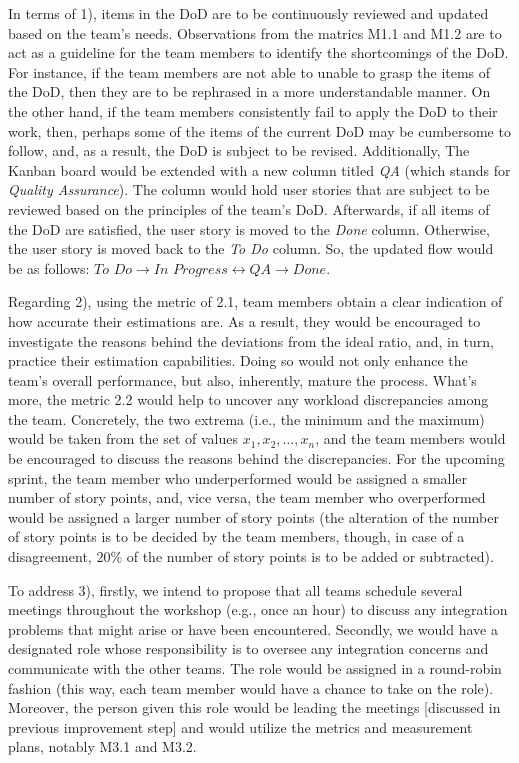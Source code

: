 \documentclass[conference]{IEEEtran}
\begin{document}
In terms of 1), items in the DoD are to be continuously reviewed and updated
based on the team's needs. Observations from the matrics M1.1 and M1.2 are to
act as a guideline for the team members to identify the shortcomings of the
DoD. For instance, if the team members are not able to unable to grasp the
items of the DoD, then they are to be rephrased in a more understandable
manner. On the other hand, if the team members consistently fail to apply the
DoD to their work, then, perhaps some of the items of the current DoD may be
cumbersome to follow, and, as a result, the DoD is subject to be revised.
Additionally, The Kanban board would be extended with a new column titled
\textit{QA} (which stands for \textit{Quality Assurance}). The column would
hold user stories that are subject to be reviewed based on the principles of
the team's DoD. Afterwards, if all items of the DoD are satisfied, the user
story is moved to the \textit{Done} column. Otherwise, the user story is moved
back to the \textit{To Do} column. So, the updated flow would be as follows:
$\textit{To Do} \to \textit{In Progress} \leftrightarrow \textit{QA} \to
\textit{Done}$.


Regarding 2), using the metric of 2.1, team members obtain a clear indication
of how accurate their estimations are. As a result, they would be encouraged to
investigate the reasons behind the deviations from the ideal ratio, and, in
turn, practice their estimation capabilities. Doing so would not only enhance
the team's overall performance, but also, inherently, mature the process.
What's more, the metric 2.2 would help to uncover any workload discrepancies
among the team. Concretely, the two extrema (i.e., the minimum and the maximum)
would be taken from the set of values $x_1, x_2, \dots, x_n$, and the team
members would be encouraged to discuss the reasons behind the discrepancies.
For the upcoming sprint, the team member who underperformed would be assigned a
smaller number of story points, and, vice versa, the team member who
overperformed would be assigned a larger number of story points (the alteration
of the number of story points is to be decided by the team members, though, in
case of a disagreement, $20\%$ of the number of story points is to be added or
subtracted).

To address 3), firstly, we intend to propose that all teams schedule several
meetings throughout the workshop (e.g., once an hour) to discuss any
integration problems that might arise or have been encountered. Secondly, we
would have a designated role whose responsibility is to oversee any integration
concerns and communicate with the other teams. The role would be assigned in a
round-robin fashion (this way, each team member would have a chance to take on
the role). Moreover, the person given this role would be leading the meetings
[discussed in previous improvement step] and would utilize the metrics and
measurement plans, notably M3.1 and M3.2.
\end{document}
